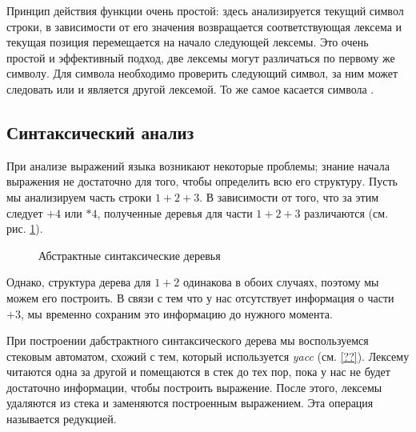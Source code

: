 Принцип действия функции  очень простой: здесь анализируется 
текущий символ строки, в зависимости от его значения возвращается 
соответствующая лексема и текущая позиция перемещается на начало следующей 
лексемы. Это очень простой и эффективный подход, две лексемы могут различаться 
по первому же символу. Для символа  необходимо проверить следующий 
символ, за ним может следовать  или  и является другой 
лексемой. То же самое касается символа .

\subsection{Синтаксический анализ}
\label{subsec:parsing}

При анализе выражений языка возникают некоторые проблемы; знание начала 
выражения не достаточно для того, чтобы определить всю его структуру. Пусть мы 
анализируем часть строки $1 + 2 + 3$. В зависимости от того, что за этим 
следует $+ 4$ или $* 4$, полученные деревья для части $1 + 2 + 3$ различаются 
(см. рис. \ref{fig:basic_abstract_syntax_tree_examples}).

\begin{figure}[h]
	\caption{\label{fig:basic_abstract_syntax_tree_examples}Абстрактные 
синтаксические деревья}
\end{figure}

Однако, структура дерева для $1 + 2$ одинакова в обоих случаях, поэтому мы 
можем его построить. В связи с тем что у нас отсутствует информация о части 
$+ 3$, мы временно сохраним это информацию до нужного момента.

При построении дабстрактного синтаксического дерева мы воспользуемся стековым 
автоматом, схожий с тем, который используется {\it yacc} (см. \ref{??}). 
Лексему читаются одна за другой и помещаются в стек до тех пор, пока у нас не 
будет достаточно информации, чтобы построить выражение. После этого, лексемы 
удаляются из стека и заменяются построенным выражением. Эта операция называется 
редукцией. 

